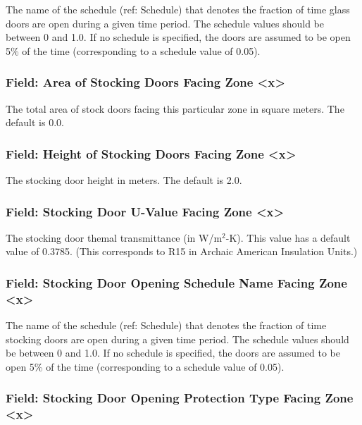 The name of the schedule (ref: Schedule) that denotes the fraction of time glass doors are open during a given time period. The schedule values should be between 0 and 1.0. If no schedule is specified, the doors are assumed to be open 5\% of the time (corresponding to a schedule value of 0.05).

\subsubsection{Field: Area of Stocking Doors Facing Zone \textless{}x\textgreater{}}\label{field-area-of-stocking-doors-facing-zone-x}

The total area of stock doors facing this particular zone in square meters. The default is 0.0.

\subsubsection{Field: Height of Stocking Doors Facing Zone \textless{}x\textgreater{}}\label{field-height-of-stocking-doors-facing-zone-x}

The stocking door height in meters. The default is 2.0.

\subsubsection{Field: Stocking Door U-Value Facing Zone \textless{}x\textgreater{}}\label{field-stocking-door-u-value-facing-zone-x}

The stocking door themal transmittance (in W/m\(^{2}\)-K). This value has a default value of 0.3785. (This corresponds to R15 in Archaic American Insulation Units.)

\subsubsection{Field: Stocking Door Opening Schedule Name Facing Zone \textless{}x\textgreater{}}\label{field-stocking-door-opening-schedule-name-facing-zone-x}

The name of the schedule (ref: Schedule) that denotes the fraction of time stocking doors are open during a given time period. The schedule values should be between 0 and 1.0. If no schedule is specified, the doors are assumed to be open 5\% of the time (corresponding to a schedule value of 0.05).

\subsubsection{Field: Stocking Door Opening Protection Type Facing Zone \textless{}x\textgreater{}}\label{field-stocking-door-opening-protection-type-facing-zone-x}

